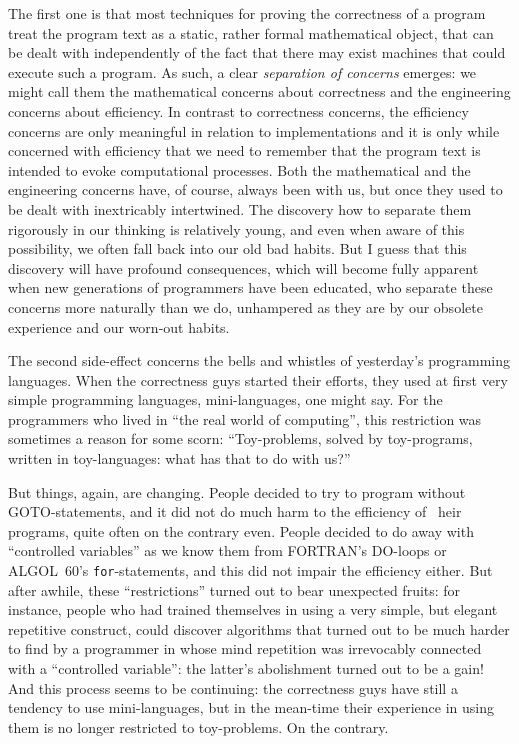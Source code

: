 \documentclass[12pt,letterpaper]{article}
\newcommand{\acro}[1]{{\small\MakeUppercase{#1}\spacefactor1000}}
\begin{document}
The first one is that most techniques for 
proving the correctness of a program treat the 
program text as a static, rather formal mathematical object, that can be dealt
with independently of the fact that there may exist machines that could execute
such a program. As such, a clear 
\emph{separation of concerns} emerges: we might call them 
the mathematical concerns about correctness and 
the engineering concerns about efficiency. In 
contrast to correctness concerns, the efficiency 
concerns are only meaningful in relation to implementations and it is only while concerned with 
efficiency that we need to remember that the program text is intended to evoke
computational processes. Both the mathematical and the engineering concerns
have, of course, always been with us, but 
once they used to be dealt with inextricably intertwined. The discovery how to
separate them rigorously in our thinking is relatively young, and even when
aware of this possibility, we often fall back 
into our old bad habits. But I guess that this 
discovery will have profound consequences, which 
will become fully apparent when new generations of 
programmers have been educated, who separate these 
concerns more naturally than we do, unhampered as 
they are by our obsolete experience and our worn-out habits. 

The second side-effect concerns the bells and 
whistles of yesterday's programming languages. When 
the correctness guys started their efforts, they 
used at first very simple programming languages, 
mini-languages, one might say. For the programmers 
who lived in ``the real world of computing'', this 
restriction was sometimes a reason for some scorn: 
``Toy-problems, solved by toy-programs, written in 
toy-languages: what has that to do with us?''

But things, again, are changing. People decided to try to program without
\acro{GOTO}-statements, and it did not do much harm to the efficiency of ~heir
programs, quite often on the contrary even. People decided to do away with
``controlled variables'' as we know them from \acro{FORTRAN}'s \acro{DO}-loops or \acro{ALGOL}~60's
\texttt{for}-statements, and this did not impair the efficiency either. But after
awhile, these ``restrictions'' turned out to bear unexpected fruits: for
instance, people who had trained themselves in using a very simple, but elegant
repetitive construct, could discover algorithms that turned out to be much
harder to find by a programmer in whose mind repetition was irrevocably
connected with a ``controlled variable'': the latter's abolishment turned out to
be a gain! And this process seems to be continuing: the correctness guys have
still a tendency to use mini-languages, but in the mean-time their experience in
using them is no longer restricted to toy-problems. On the contrary. 
\end{document}
